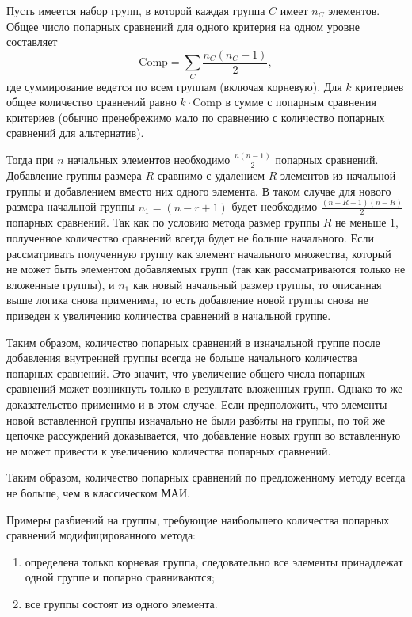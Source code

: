 Пусть имеется набор групп, в которой каждая группа \(C\) имеет \(n_C\) элементов. 
Общее число попарных сравнений для одного критерия на одном уровне составляет
\begin{equation}
    \text{Comp} = \sum_{C} \frac{n_C (n_C - 1)}{2},
    \label{eq:poparsrav}
\end{equation}
где суммирование ведется по всем группам (включая корневую).
Для \(k\) критериев общее количество сравнений равно \(k \cdot \text{Comp}\) в сумме с попарным сравнения критериев (обычно пренебрежимо мало по сравнению с количество попарных сравнений для альтернатив).

Тогда при $n$ начальных элементов необходимо \(\frac{n(n-1)}{2}\) попарных сравнений.
Добавление группы размера $R$ сравнимо с удалением $R$ элементов из начальной группы и добавлением вместо них одного элемента.
В таком случае для нового размера начальной группы $n_1 = (n - r + 1)$ будет необходимо \(\frac{(n - R + 1)(n - R)}{2}\) попарных сравнений.
Так как по условию метода размер группы $R$ не меньше $1$, полученное количество сравнений всегда будет не больше начального.
Если рассматривать полученную группу как элемент начального множества, который не может быть элементом добавляемых групп (так как рассматриваются только не вложенные группы), и $n_1$ как новый начальный размер группы, то описанная выше логика снова применима, то есть добавление новой группы снова не приведен к увеличению количества сравнений в начальной группе.

Таким образом, количество попарных сравнений в изначальной группе после добавления внутренней группы всегда не больше начального количества попарных сравнений.
Это значит, что увеличение общего числа попарных сравнений может возникнуть только в результате вложенных групп.
Однако то же доказательство применимо и в этом случае.
Если предположить, что элементы новой вставленной группы изначально не были разбиты на группы, по той же цепочке рассуждений доказывается, что добавление новых групп во вставленную не может привести к увеличению количества попарных сравнений.

Таким образом, количество попарных сравнений по предложенному методу всегда не больше, чем в классическом МАИ.

Примеры разбиений на группы, требующие наибольшего количества попарных сравнений модифицированного метода:
\begin{enumerate}
    \item определена только корневая группа, следовательно все элементы принадлежат одной группе и попарно сравниваются;
    \item все группы состоят из одного элемента.
\end{enumerate}

